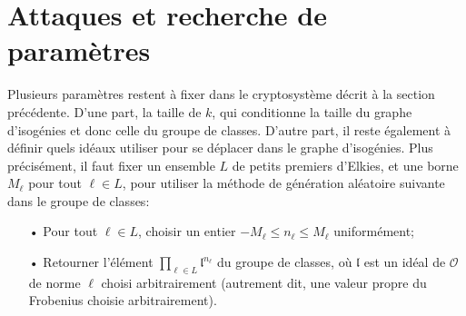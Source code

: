 \documentclass[11pt,a4paper]{article}
\newcommand{\F}{\mathbb{F}}
\renewcommand{\O}{\mathcal{O}}
\renewcommand{\frak}{\mathfrak}
\theoremstyle{definition}
\begin{document}
%
%
%

\newpage
\section{Attaques et recherche de paramètres}

Plusieurs paramètres restent à fixer dans le cryptosystème décrit à la section précédente. D'une part, la taille de $k$, qui conditionne la taille du graphe d'isogénies et donc celle du groupe de classes. D'autre part, il reste également à définir quels idéaux utiliser pour se déplacer dans le graphe d'isogénies. Plus précisément, il faut fixer un ensemble $L$ de petits premiers d'Elkies, et une borne $M_\ell$ pour tout $\ell\in L$, pour utiliser la méthode de génération aléatoire suivante dans le groupe de classes:
\begin{itemize}
\item[•] Pour tout $\ell\in L$, choisir un entier $- M_\ell\leq n_\ell\leq M_\ell$ uniformément;
\item[•] Retourner l'élément $\prod_{\ell\in L} {\frak l}^{n_\ell}$ du groupe de classes, où $\frak l$ est un idéal de $\O$ de norme $\ell$ choisi arbitrairement (autrement dit, une valeur propre du Frobenius choisie arbitrairement).
\end{itemize}
\end{document}
